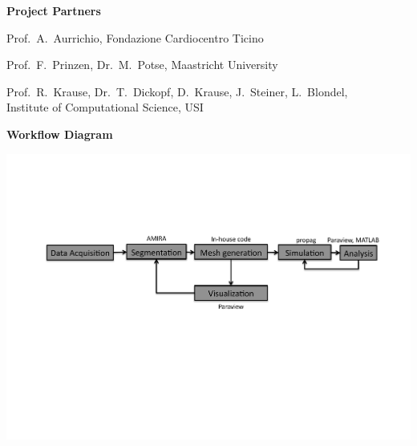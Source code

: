 \documentclass[12pt]{ICSPoster}
\begin{document}
  \begin{posterbox}[2]
    \begin{headerbox}[
        title=End-to-End Workflow,
        height=0.25\textheight,
        width=0.47\textwidth]
      \begin{minipage}{\textwidth}\sf
        \textbf{Project Partners}
        \begin{compactitem}
          \item Prof.~A.~Aurrichio, Fondazione Cardiocentro Ticino
          \item Prof.~F.~Prinzen, Dr.~M.~Potse, Maastricht University
          \item Prof.~R.~Krause, Dr.~T.~Dickopf, D.~Krause, J.~Steiner, L.~Blondel,\\ Institute of Computational Science, USI
        \end{compactitem}
        \vspace{0.5cm}

        \textbf{Workflow Diagram}

        \includegraphics[width=\textwidth]{Workflow}
      \end{minipage}


\end{headerbox}
\end{posterbox}
\end{document}
